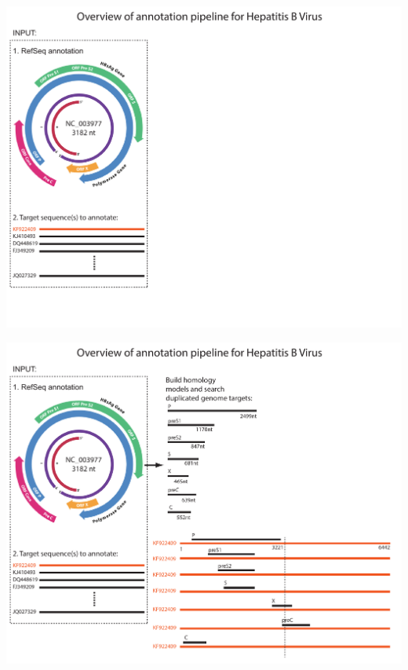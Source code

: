 \documentclass[landscape]{slides}
\begin{document}
\begin{slide}
\begin{center}
\end{center}

\tiny
{}
\vfill
\end{slide}
\begin{slide}
\begin{center}
\includegraphics[width=10in]{figs/annotation-schematic-hbv-1}
\end{center}
\vfill
\end{slide}
\begin{slide}
\begin{center}
\includegraphics[width=10in]{figs/annotation-schematic-hbv-2}
\end{center}
\vfill
\end{slide}
\end{document}
